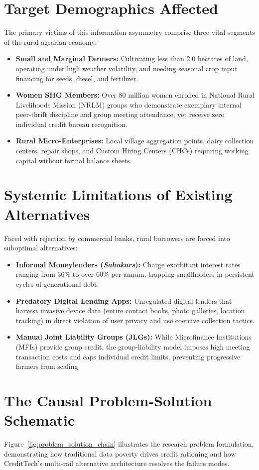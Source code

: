 \section{Target Demographics Affected}
The primary victims of this information asymmetry comprise three vital segments of the rural agrarian economy:
\begin{itemize}
  \item \textbf{Small and Marginal Farmers:} Cultivating less than 2.0 hectares of land, operating under high weather volatility, and needing seasonal crop input financing for seeds, diesel, and fertilizer.
  \item \textbf{Women SHG Members:} Over 80 million women enrolled in National Rural Livelihoods Mission (NRLM) groups who demonstrate exemplary internal peer-thrift discipline and group meeting attendance, yet receive zero individual credit bureau recognition.
  \item \textbf{Rural Micro-Enterprises:} Local village aggregation points, dairy collection centers, repair shops, and Custom Hiring Centers (CHCs) requiring working capital without formal balance sheets.
\end{itemize}

\section{Systemic Limitations of Existing Alternatives}
Faced with rejection by commercial banks, rural borrowers are forced into suboptimal alternatives:
\begin{itemize}
  \item \textbf{Informal Moneylenders (\textit{Sahukars}):} Charge exorbitant interest rates ranging from $36\%$ to over $60\%$ per annum, trapping smallholders in persistent cycles of generational debt.
  \item \textbf{Predatory Digital Lending Apps:} Unregulated digital lenders that harvest invasive device data (entire contact books, photo galleries, location tracking) in direct violation of user privacy and use coercive collection tactics.
  \item \textbf{Manual Joint Liability Groups (JLGs):} While Microfinance Institutions (MFIs) provide group credit, the group-liability model imposes high meeting transaction costs and caps individual credit limits, preventing progressive farmers from scaling.
\end{itemize}

\section{The Causal Problem-Solution Schematic}
Figure~\ref{fig:problem_solution_chain} illustrates the research problem formulation, demonstrating how traditional data poverty drives credit rationing and how CreditTech's multi-rail alternative architecture resolves the failure modes.

